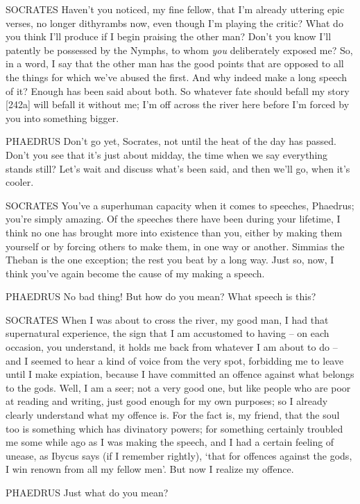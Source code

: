  SOCRATES Haven't you noticed, my fine fellow, that I'm already
uttering epic verses, no longer dithyrambs now, even though I'm playing
the critic? What do you
think I'll produce if I begin praising the other man? Don't you know
I'll patently be  possessed by the Nymphs, to whom {\em you}
deliberately exposed me? So, in a word, I say that the other man has the
good points that are opposed to all the things for which we've abused
the first. And why indeed make a long speech of it? Enough has been said
about both. So whatever fate should befall my story {[}242a{]} will
befall it without me; I'm
off across the river here before I'm forced by you into something
bigger.

PHAEDRUS Don't go yet, Socrates, not until the heat of the day has
passed. Don't you see that it's just about midday, the
time when we say
everything stands still? Let's wait and discuss  what's been
said, and then we'll go, when it's cooler.

SOCRATES You've a superhuman
capacity when it comes to
speeches, Phaedrus; you're simply amazing. Of the speeches there have
been during your lifetime, I think no one has brought  more into
existence than you, either by making them yourself or by forcing others
to make them, in one way or another. Simmias the
Theban is the one
exception; the rest you beat by a long way. Just so, now, I think you've
again become the cause of my making a speech. 

PHAEDRUS No bad thing! But how do you mean? What speech is this?

SOCRATES When I was about to cross the river, my good man, I had that
supernatural experience, the
sign that I am accustomed
to having -- on each occasion, you understand, it  holds me back
from whatever I am about to do -- and I seemed to hear a kind of voice
from the very spot, forbidding me to leave until I make expiation,
because I have committed an offence against what belongs to the
gods. Well, I am a seer;
not a very good one, but like people who are poor at reading 
and writing, just good enough for my own purposes; so I already clearly
understand what my offence is. For the fact is, my friend, that the soul
too is something which has divinatory powers; for something certainly
troubled me some while ago as I was making the speech, and I had a
certain feeling of unease, as Ibycus says (if I remember rightly), ‘that
for offences against  the gods, I win renown from all my fellow
men'. But now I realize
my offence.

PHAEDRUS Just what do you mean?

